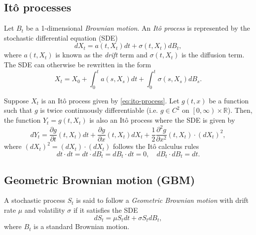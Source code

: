 \subsection{It\^{o} processes}
Let $B_t$ be a 1-dimensional \textit{Brownian motion}. An \textit{It\^{o} process} is represented by the stochastic differential equation (SDE)
\begin{equation}
    dX_t = a(t, X_t) dt + \sigma(t, X_t) dB_t, \label{eq:ito-process}
\end{equation}
where $a(t, X_t)$ is known as the \textit{drift} term and $\sigma(t, X_t)$ is the diffusion term. The SDE can otherwise be rewritten in the form
\begin{equation}
    X_t = X_0 + \int_0^t a(s, X_s) dt + \int_0^t \sigma(s, X_s) dB_s.
\end{equation}
\begin{theorem}
    \label{thm:ito-lemma}
    Suppose $X_t$ is an It\^{o} process given by \eqref{eq:ito-process}. Let $g(t, x)$ be a function such that $g$ is twice continuously differentiable (i.e. $g \in C^2$ on $\left [ 0, \infty \right ) \times \mathbb{R}$).
    Then, the function $Y_t = g(t, X_t)$ is also an It\^{o} process where the SDE is given by
    \begin{equation}
        dY_t = \frac{\partial g}{\partial t} (t, X_t) dt + \frac{\partial g}{\partial x} (t, X_t) dX_t + \frac{1}{2} \frac{\partial^2 g}{\partial x^2} (t, X_t) \cdot (dX_t)^2,
    \end{equation}
    where $(dX_t)^2 = (dX_t) \cdot (dX_t)$ follows the It\^{o} calculus rules
    \begin{equation}
        dt \cdot dt = dt \cdot dB_t = dB_t \cdot dt = 0, \quad dB_t \cdot dB_t = dt. \label{eq:ito-calculus_rules}
    \end{equation}
\end{theorem}

\subsection{Geometric Brownian motion (GBM)}
A stochastic process $S_t$ is said to follow a \textit{Geometric Brownian motion} with drift rate $\mu$ and volatility $\sigma$ if it satisfies the SDE
\begin{equation}
    dS_t = \mu S_t dt + \sigma S_t dB_t, \label{eq:gbm}
\end{equation}
where $B_t$ is a standard Brownian motion.

